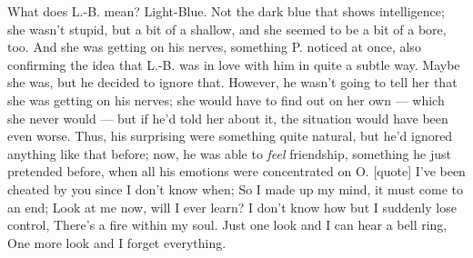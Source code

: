 What does L.-B. mean? Light-Blue. Not the dark blue that shows intelligence; she wasn't stupid, but a bit of a shallow, and she seemed to be a bit of a bore, too. 
And she was getting on his nerves, something P. noticed at once, also confirming the idea that L.-B. was in love with him in quite a subtle way. 
Maybe she was, but he decided to ignore that. 
However, he wasn't going to tell her that she was getting on his nerves; she would have to find out on her own --- which she never would --- but if he'd told her about it, the situation would have been even worse. 
Thus, his surprising were something quite natural, but he'd ignored anything like that before; now, he was able to \emph{feel} friendship, something he just pretended before, when all his emotions were concentrated on O. 
[quote]
I've been cheated by you since I don't know when;
So I made up my mind, it must come to an end;
Look at me now, will I ever learn? 
I don't know how but I suddenly lose control,
There's a fire within my soul. 
Just one look and I can hear a bell ring,
One more look and I forget everything. 
 
